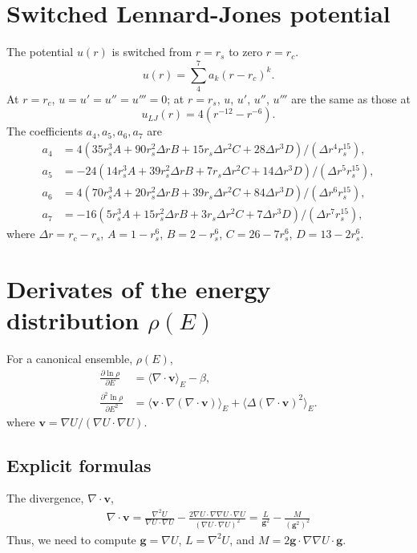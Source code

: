\documentclass{article}
\begin{document}
\section{Switched Lennard-Jones potential}

The potential $u(r)$ is switched from $r = r_s$ to zero $r = r_c$.
\[
  u(r) = \sum_4^7 a_k (r - r_c)^k.
\]
At $r = r_c$, $u = u' = u'' = u''' = 0$;
at $r = r_s$, $u$, $u'$, $u''$, $u'''$ are the same as those at
\[
  u_{LJ}(r) = 4 (r^{-12} - r^{-6}).
\]
The coefficients $a_4, a_5, a_6, a_7$ are 
\begin{align}
  a_4 &= 4 (35 r_s^3 A + 90 r_s^2 \Delta r B + 15 r_s \Delta r^2 C + 28 \Delta r^3 D)/(\Delta r^4 r_s^15), \\
  a_5 &= -24 (14 r_s^3 A + 39 r_s^2 \Delta r B + 7 r_s \Delta r^2 C + 14 \Delta r^3 D)/(\Delta r^5 r_s^15), \\
  a_6 &= 4 (70 r_s^3 A + 20 r_s^2 \Delta r B + 39 r_s \Delta r^2 C + 84 \Delta r^3 D)/(\Delta r^6 r_s^15), \\
  a_7 & = -16 (5 r_s^3 A + 15 r_s^2 \Delta r B + 3 r_s \Delta r^2 C + 7 \Delta r^3 D)/(\Delta r^7 r_s^15),
\end{align}
where $\Delta r = r_c - r_s$, 
$A = 1 - r_s^6$,
$B = 2 - r_s^6$,
$C = 26 - 7 r_s^6$,
$D = 13 - 2 r_s^6$.


\section{Derivates of the energy distribution $\rho(E)$}
For a canonical ensemble, $\rho(E)$,
\begin{align}
\frac {\partial \ln \rho} 
      {\partial E}
    & = \langle \nabla \cdot \mathbf v \rangle_E - \beta, \\
\frac {\partial^2 \ln \rho}
      {\partial E^2}
    & = \langle \mathbf v \cdot \nabla (\nabla \cdot \mathbf v) \rangle_E
      + \langle \Delta (\nabla \cdot \mathbf v)^2 \rangle_E.
\end{align}
where $\mathbf v = \nabla U/(\nabla U \cdot \nabla U)$.


\subsection{Explicit formulas}

The divergence, $\nabla \cdot \mathbf v$,
\begin{align*}
\nabla \cdot \mathbf v
     = \frac { \nabla^2 U }
              { \nabla U \cdot \nabla U }
      - \frac { 2 \nabla U \cdot \nabla \nabla U \cdot \nabla U }
              { (\nabla U \cdot \nabla U)^2 }
     = \frac { L }
              { \mathbf g^2 }
      - \frac { M }
              { (\mathbf g^2)^2 }
\end{align*}
Thus, we need to compute $\mathbf g = \nabla U$, 
$L = \nabla^2 U$, and $M = 2 \mathbf g \cdot \nabla \nabla U \cdot \mathbf g$.
\end{document}
